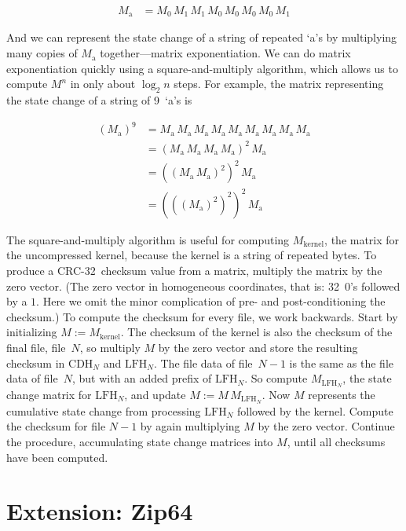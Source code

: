 \documentclass[letterpaper,twocolumn,10pt]{article}
\newcommand{\CDH}{\mathrm{CDH}}
\newcommand{\LFH}{\mathrm{LFH}}
\newcommand{\CRC}{\mbox{CRC-32}}
\begin{document}
\begin{align*}
M_\mathrm{a} &= M_0 \, M_1 \, M_1 \, M_0 \, M_0 \, M_0 \, M_0 \, M_1
\end{align*}

\noindent
And we can represent the state change of a string of repeated `a's
by multiplying many copies of $M_\mathrm{a}$ together---matrix exponentiation.
We can do matrix exponentiation quickly
using a square-and-multiply algorithm,
which allows us to compute $M^n$
in only about $\log_2 n$ steps.
For example, the matrix representing the state change
of a string of 9~`a's is

\begin{align*}
(M_\mathrm{a})^9 &= M_\mathrm{a} \, M_\mathrm{a} \, M_\mathrm{a} \, M_\mathrm{a} \, M_\mathrm{a} \, M_\mathrm{a} \, M_\mathrm{a} \, M_\mathrm{a} \, M_\mathrm{a} \\
&= (M_\mathrm{a} \, M_\mathrm{a} \, M_\mathrm{a} \, M_\mathrm{a})^2 \, M_\mathrm{a} \\
&= ((M_\mathrm{a} \, M_\mathrm{a})^2)^2 \, M_\mathrm{a} \\
&= (((M_\mathrm{a})^2)^2)^2 \, M_\mathrm{a}
\end{align*}

The square-and-multiply algorithm is useful
for computing $M_\mathrm{kernel}$,
the matrix for the uncompressed kernel,
because the kernel is a string of repeated bytes.
To produce a \CRC\ checksum value from a matrix,
multiply the matrix by the zero vector.
(The zero vector in homogeneous coordinates, that is:
32~$0$'s followed by a $1$.
Here we omit the minor complication of pre- and post-conditioning the checksum.)
To compute the checksum for every file, we work backwards.
Start by initializing $M := M_\mathrm{kernel}$.
The checksum of the kernel is also the checksum
of the final file, file~$N$,
so multiply $M$ by the zero vector and store the resulting checksum in
$\CDH_N$ and $\LFH_N$.
The file data of file~$N-1$ is the same as the file data of file~$N$,
but with an added prefix of $\LFH_N$.
So compute $M_{\LFH_N}$, the state change matrix for $\LFH_N$,
and update $M := M \, M_{\LFH_N}$.
Now $M$ represents the cumulative state change from processing
$\LFH_N$ followed by the kernel.
Compute the checksum for file $N-1$ by again multiplying $M$ by the zero vector.
Continue the procedure, accumulating state change matrices into $M$,
until all checksums have been computed.


\section{Extension: Zip64}
\label{sec:zip64}
\end{document}
